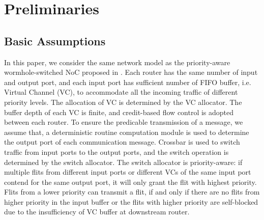 \documentclass[10pt,journal]{IEEEtran}
\begin{document}
\section{Preliminaries}\label{model}
\subsection{Basic Assumptions}
In this paper, we consider the same network model as the priority-aware wormhole-switched NoC proposed in \cite{627905}\cite{Shi:2008:RCA:1397757.1397996}\cite{707545}\cite{73}. Each router has the same number of input and output port, and each input port has sufficient number of FIFO buffer, i.e. Virtual Channel (VC), to accommodate all the incoming traffic of different priority levels. The allocation of VC is determined by the VC allocator. The buffer depth of each VC is finite, and credit-based flow control is adopted between each router. To ensure the predicable transmission of a message, we assume that, a deterministic routine computation module is used to determine the output port of each communication message. Crossbar is used to switch traffic from input ports to the output ports, and the switch operation is determined by the switch allocator. The switch allocator is priority-aware: if multiple flits from different input ports or different VCs of the same input port contend for the same output port, it will only grant the flit with highest priority. Flits from a lower priority can transmit a flit, if and only if there are no flits from higher priority in the input buffer or the flits with higher priority are self-blocked due to the insufficiency of VC buffer at downstream router.
\end{document}
